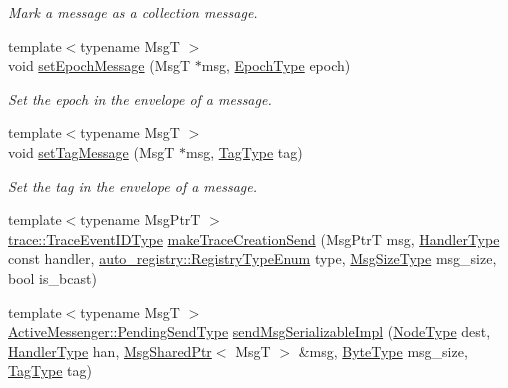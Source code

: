 \begin{DoxyCompactItemize}
\begin{DoxyCompactList}\small\item\em Mark a message as a collection message. \end{DoxyCompactList}\item 
{\footnotesize template$<$typename MsgT $>$ }\\void \hyperlink{structvt_1_1messaging_1_1_active_messenger_a5fc9cb79e5cbef41007d847964c17113}{set\+Epoch\+Message} (MsgT $\ast$msg, \hyperlink{namespacevt_a985a5adf291c34a3ca263b3378388236}{Epoch\+Type} epoch)
\begin{DoxyCompactList}\small\item\em Set the epoch in the envelope of a message. \end{DoxyCompactList}\item 
{\footnotesize template$<$typename MsgT $>$ }\\void \hyperlink{structvt_1_1messaging_1_1_active_messenger_ab6d3637cb3c416b3491b748aaf4bab48}{set\+Tag\+Message} (MsgT $\ast$msg, \hyperlink{namespacevt_a84ab281dae04a52a4b243d6bf62d0e52}{Tag\+Type} tag)
\begin{DoxyCompactList}\small\item\em Set the tag in the envelope of a message. \end{DoxyCompactList}\item 
{\footnotesize template$<$typename Msg\+PtrT $>$ }\\\hyperlink{namespacevt_1_1trace_a64a7185f3e102df8d8258f263ccd1582}{trace\+::\+Trace\+Event\+I\+D\+Type} \hyperlink{structvt_1_1messaging_1_1_active_messenger_a527858e860bb7b373489ae425fd3fdcc}{make\+Trace\+Creation\+Send} (Msg\+PtrT msg, \hyperlink{namespacevt_af64846b57dfcaf104da3ef6967917573}{Handler\+Type} const handler, \hyperlink{namespacevt_1_1auto__registry_a9f369ca2b484130b396729e2ddf05241}{auto\+\_\+registry\+::\+Registry\+Type\+Enum} type, \hyperlink{namespacevt_abfa009d900299ac1df967b40ea8f2c8a}{Msg\+Size\+Type} msg\+\_\+size, bool is\+\_\+bcast)
\item 
{\footnotesize template$<$typename MsgT $>$ }\\\hyperlink{structvt_1_1messaging_1_1_active_messenger_a3626a6ca76d8ad4ec7c3b47a2c70d3a8}{Active\+Messenger\+::\+Pending\+Send\+Type} \hyperlink{structvt_1_1messaging_1_1_active_messenger_a957903699d6ab76b0cf39833c777772e}{send\+Msg\+Serializable\+Impl} (\hyperlink{namespacevt_a866da9d0efc19c0a1ce79e9e492f47e2}{Node\+Type} dest, \hyperlink{namespacevt_af64846b57dfcaf104da3ef6967917573}{Handler\+Type} han, \hyperlink{structvt_1_1messaging_1_1_msg_shared_ptr}{Msg\+Shared\+Ptr}$<$ MsgT $>$ \&msg, \hyperlink{namespacevt_aab8d55968084610ce3b17057981e9300}{Byte\+Type} msg\+\_\+size, \hyperlink{namespacevt_a84ab281dae04a52a4b243d6bf62d0e52}{Tag\+Type} tag)

\end{DoxyCompactItemize}
